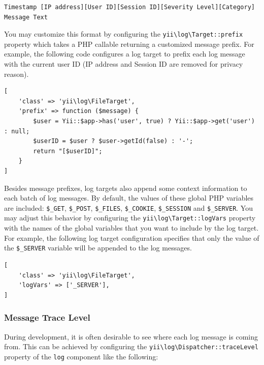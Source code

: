 \begin{lstlisting}
Timestamp [IP address][User ID][Session ID][Severity Level][Category] Message Text
\end{lstlisting}
You may customize this format by configuring the \texttt{yii{\allowbreak{}\textbackslash}log{\allowbreak{}\textbackslash}Target\allowbreak{}::\allowbreak{}prefix} property which takes a PHP callable
returning a customized message prefix. For example, the following code configures a log target to prefix each
log message with the current user ID (IP address and Session ID are removed for privacy reason).

\lstset{language=php}\begin{lstlisting}
[
    'class' => 'yii\log\FileTarget',
    'prefix' => function ($message) {
        $user = Yii::$app->has('user', true) ? Yii::$app->get('user') : null;
        $userID = $user ? $user->getId(false) : '-';
        return "[$userID]";
    }
]
\end{lstlisting}
Besides message prefixes, log targets also append some context information to each batch of log messages.
By default, the values of these global PHP variables are included: \lstinline|$_GET|, \lstinline|$_POST|, \lstinline|$_FILES|, \lstinline|$_COOKIE|,
\lstinline|$_SESSION| and \lstinline|$_SERVER|. You may adjust this behavior by configuring the \texttt{yii{\allowbreak{}\textbackslash}log{\allowbreak{}\textbackslash}Target\allowbreak{}::\allowbreak{}logVars} property
with the names of the global variables that you want to include by the log target. For example, the following
log target configuration specifies that only the value of the \lstinline|$_SERVER| variable will be appended to the log messages.

\lstset{language=php}\begin{lstlisting}
[
    'class' => 'yii\log\FileTarget',
    'logVars' => ['_SERVER'],
]
\end{lstlisting}
\subsubsection{Message Trace Level \label{runtime-logging.md::trace-level}}
During development, it is often desirable to see where each log message is coming from. This can be achieved by
configuring the \texttt{yii{\allowbreak{}\textbackslash}log{\allowbreak{}\textbackslash}Dispatcher\allowbreak{}::\allowbreak{}traceLevel} property of the \lstinline|log| component like the following:

